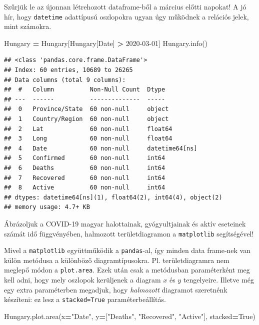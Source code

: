 \documentclass[
]{book}
\newenvironment{Shaded}{\begin{snugshade}}{\end{snugshade}}
\newcommand{\NormalTok}[1]{#1}
\newcommand{\OperatorTok}[1]{\textcolor[rgb]{0.81,0.36,0.00}{\textbf{#1}}}
\newcommand{\StringTok}[1]{\textcolor[rgb]{0.31,0.60,0.02}{#1}}
\newcommand{\VariableTok}[1]{\textcolor[rgb]{0.00,0.00,0.00}{#1}}
\begin{document}
Szűrjük le az újonnan létrehozott dataframe-ből a március előtti napokat! A jó hír, hogy \texttt{datetime} adattípusú oszlopokra ugyan úgy működnek a relációs jelek, mint számokra.

\begin{Shaded}
\begin{Highlighting}[]
\NormalTok{Hungary }\OperatorTok{=}\NormalTok{ Hungary[Hungary[}\StringTok{\textquotesingle{}Date\textquotesingle{}}\NormalTok{] }\OperatorTok{\textgreater{}} \StringTok{\textquotesingle{}2020{-}03{-}01\textquotesingle{}}\NormalTok{]}
\NormalTok{Hungary.info()}
\end{Highlighting}
\end{Shaded}

\begin{verbatim}
## <class 'pandas.core.frame.DataFrame'>
## Index: 60 entries, 10689 to 26265
## Data columns (total 9 columns):
##  #   Column          Non-Null Count  Dtype         
## ---  ------          --------------  -----         
##  0   Province/State  60 non-null     object        
##  1   Country/Region  60 non-null     object        
##  2   Lat             60 non-null     float64       
##  3   Long            60 non-null     float64       
##  4   Date            60 non-null     datetime64[ns]
##  5   Confirmed       60 non-null     int64         
##  6   Deaths          60 non-null     int64         
##  7   Recovered       60 non-null     int64         
##  8   Active          60 non-null     int64         
## dtypes: datetime64[ns](1), float64(2), int64(4), object(2)
## memory usage: 4.7+ KB
\end{verbatim}

Ábrázoljuk a COVID-19 magyar halottainak, gyógyultjainak és aktív eseteinek számát idő függvényében, halmozott területdiagramon a \texttt{matplotlib} segítségével!

Mivel a \texttt{matplotlib} együttműködik a \texttt{pandas}-al, így minden data frame-nek van külön metódusa a különböző diagramtípusokra. Pl. területdiagramra nem meglepő módon a \texttt{plot.area}. Ezek után csak a metódusban paraméterként meg kell adni, hogy mely oszlopok kerüljenek a diagram \(x\) és \(y\) tengelyeire. Illetve még egy extra paraméterben megadjuk, hogy \emph{halmozott} diagramot szeretnénk készíteni: ez lesz a \texttt{stacked=True} paraméterbeállítás.

\begin{Shaded}
\begin{Highlighting}[]
\NormalTok{Hungary.plot.area(x}\OperatorTok{=}\StringTok{"Date"}\NormalTok{, y}\OperatorTok{=}\NormalTok{[}\StringTok{"Deaths"}\NormalTok{, }\StringTok{"Recovered"}\NormalTok{, }\StringTok{"Active"}\NormalTok{], stacked}\OperatorTok{=}\VariableTok{True}\NormalTok{)}
\end{Highlighting}
\end{Shaded}
\end{document}

